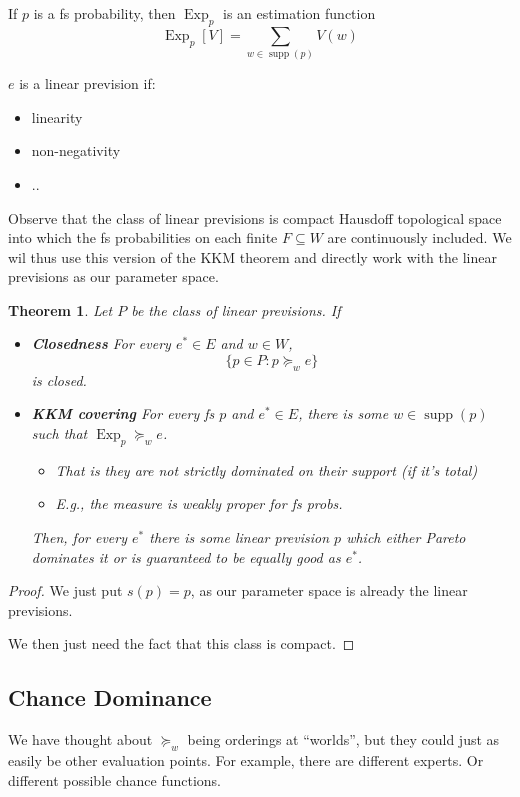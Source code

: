 \documentclass[11pt]{article}
\newtheorem{theorem}{Theorem}[section]
\theoremstyle{definition}
\theoremstyle{remark}
\newcommand{\supp}{\operatorname{supp}}
\newcommand{\Exp}{\operatorname{Exp}}
\begin{document}
If $p$ is a fs probability, then $\Exp_p$ is an estimation function \[\Exp_p[V]=\sum_{w\in\supp(p)}V(w)\]

$e$ is a linear prevision if: 
\begin{itemize}
	\item linearity
	\item non-negativity
	\item ..
\end{itemize}

Observe that the class of linear previsions is compact Hausdoff topological space into which the fs probabilities on each finite $F\subseteq W$ are continuously included. We wil thus use this version of the KKM theorem and directly work with the linear previsions as our parameter space. 

\begin{theorem}
	Let $P$ be the class of linear previsions. 
	If 
	\begin{itemize}
		\item \textbf{Closedness} 
		For every $e^*\in E$ and $w\in W$, \[\{p\in P: p\succeq_w e\}\] is closed.
		\item \textbf{KKM covering} For every fs $p$ and $e^*\in E$, there is some $w\in\supp(p)$ such that $\Exp_p\succeq_w e$. 
		\begin{itemize}
			\item That is they are not strictly dominated on their support (if it's total)
			\item E.g., the measure is weakly proper for fs probs. 
		\end{itemize}
		Then, for every $e^*$ there is some linear prevision $p$ which either Pareto dominates it or is guaranteed to be equally good as $e^*$. 
	\end{itemize}
\end{theorem}
\begin{proof}
	We just put $s(p)=p$, as our parameter space is already the linear previsions. 
	
	We then just need the fact that this class is compact. 
\end{proof}




\subsection{Chance Dominance}

We have thought about $\succeq_w$ being orderings at ``worlds'', but they could just as easily be other evaluation points. For example, there are different experts. Or different possible chance functions. 
\end{document}
